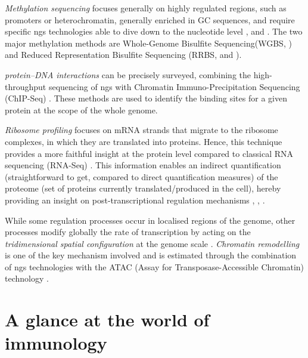 \begin{enumerate}[label=(\roman*)]
\emph{Methylation sequencing} focuses generally on highly regulated regions, such as promoters or heterochromatin, generally enriched in GC sequences, and require specific \acrshort{ngs} technologies able to dive down to the nucleotide level \autocite{zmarzly_etal16}, \autocite{coleman-derr_zilberman12} and \autocite{han_etal07}. The two major methylation methods are Whole-Genome Bisulfite Sequencing(WGBS, \autocite{zhou_etal19a}) and Reduced Representation Bisulfite Sequencing (RRBS, \autocite{sang21} and \autocite{wan_bell20}). 

\emph{protein–DNA interactions} can be precisely surveyed, combining the high-throughput sequencing of \acrshort{ngs} with Chromatin Immuno-Precipitation Sequencing (ChIP-Seq) \autocite{small_etal21}. These methods are used to identify the binding sites for a given protein at the scope of the whole genome. 

\emph{Ribosome profiling} focuses on mRNA strands that migrate to the ribosome complexes, in which they are translated into proteins. Hence, this technique provides a more faithful insight at the protein level compared to classical RNA sequencing (RNA-Seq) \autocite{blevins_etal19}. This information enables an indirect quantification (straightforward to get, compared to direct quantification measures) of the proteome (set of proteins currently translated/produced in the cell), hereby providing an insight on post-transcriptional regulation mechanisms , \autocite{kiniry_etal20}, \autocite{yadav_etal21}.   

While some regulation processes occur in localised regions of the genome, other processes modify globally the rate of transcription by acting on the \emph{tridimensional spatial configuration} at the genome scale . \emph{Chromatin remodelling} is one of the key mechanism involved and is estimated through the combination of \acrshort{ngs} technologies with the ATAC (Assay for Transposase-Accessible Chromatin) technology \autocite{ahmed_ucar17} \autocite{sahu_etal21}.
\end{enumerate}

\section{A glance at the world of immunology}
\label{sec:immunology}

